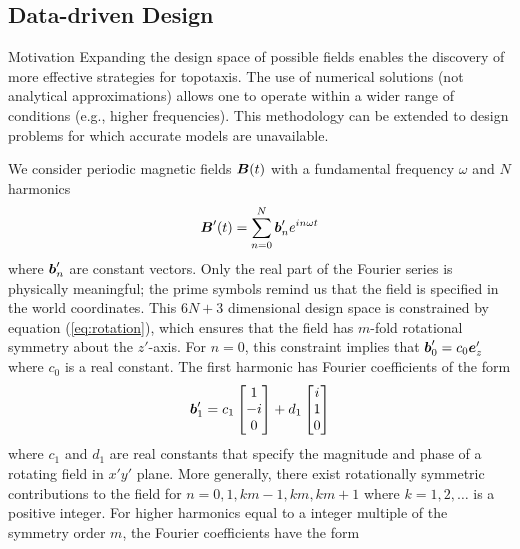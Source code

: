 \subsection{Data-driven Design}

\begin{outline}
    \1 Motivation
        \2 Expanding the design space of possible fields enables the discovery of more effective strategies for topotaxis.
        \2 The use of numerical solutions (not analytical approximations) allows one to operate within a wider range of conditions (e.g., higher frequencies).
        \2 This methodology can be extended to design problems for which accurate models are unavailable.
\end{outline}


We consider periodic magnetic fields $\boldsymbol{B}(t)$ with a fundamental frequency $\omega$ and $N$ harmonics
\begin{equation}
    \boldsymbol{B}'(t) = \sum_{n=0}^N \boldsymbol{b}'_n e^{i n \omega t}
\end{equation}
where $\boldsymbol{b}'_n$ are constant vectors. Only the real part of the Fourier series is physically meaningful; the prime symbols remind us that the field is specified in the world coordinates.  This $6N+3$ dimensional design space is constrained by equation (\ref{eq:rotation}), which ensures that the field has $m$-fold rotational symmetry about the $z'$-axis. For $n=0$, this constraint implies that $\boldsymbol{b}'_0 = c_0 \boldsymbol{e}'_{z}$ where $c_0$ is a real constant. The first harmonic has Fourier coefficients of the form 
\begin{equation}
    \boldsymbol{b}'_1 = c_1 \begin{bmatrix} 1\\-i\\0\\ \end{bmatrix} + d_1 \begin{bmatrix} i\\1\\0 \end{bmatrix}
\end{equation}
where $c_1$ and $d_1$ are  real constants that specify the magnitude and phase of a rotating field in $x'y'$ plane. More generally, there exist rotationally symmetric contributions to the field for $n=0, 1, k m-1, k m, k m + 1$  where $k= 1,2,\dots$ is a positive integer. For higher harmonics equal to a integer multiple of the symmetry order $m$, the Fourier coefficients have the form
